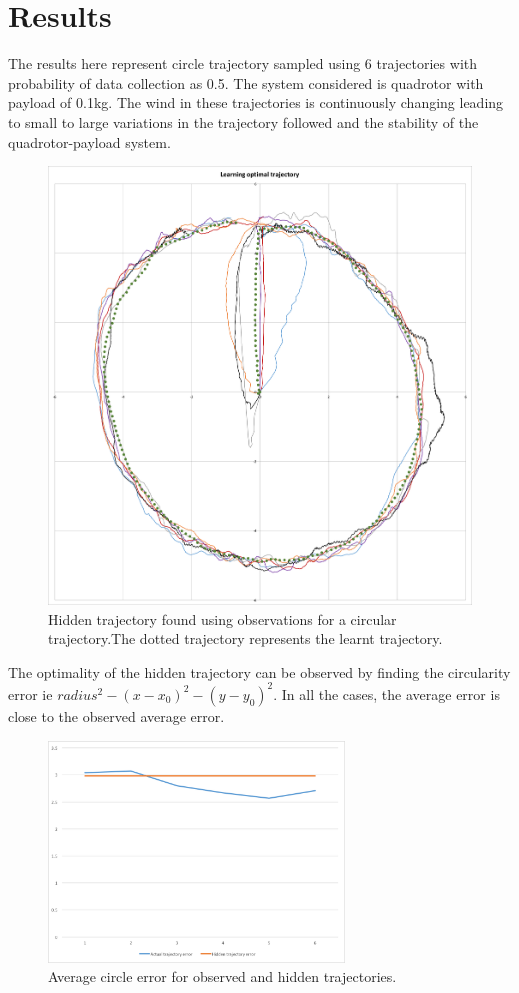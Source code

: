 \documentclass[hidelinks,BTech]{iitmdiss}
\begin{document}
\section{Results}
The results here represent circle trajectory sampled using 6 trajectories with probability of data collection as 0.5. The system considered is quadrotor with payload of 0.1kg. The wind in these trajectories is continuously changing leading to small to large variations in the trajectory followed and the stability of the quadrotor-payload system. 

\begin{figure}[H]
  \centering
    \includegraphics[width=\textwidth]{Apprenticeship_hidden_trajectory.png}
    \caption{Hidden trajectory found using observations for a circular trajectory.The dotted trajectory represents the learnt trajectory.}
\end{figure}

The optimality of the hidden trajectory can be observed by finding the circularity error ie $radius^2 - (x-x_0)^2 - (y-y_0)^2$. In all the cases, the average error is close to the observed average error.
\begin{figure}[H]
  \centering
    \includegraphics[width=0.7\textwidth]{Apprenticeship_optimality_graph.png}
    \caption{Average circle error for observed and hidden trajectories.}
\end{figure}	
\end{document}
